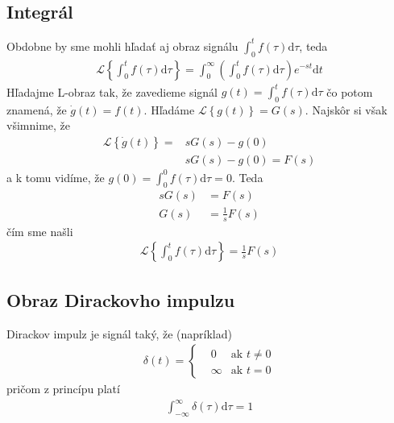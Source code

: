 \documentclass[a4paper, 10pt, ]{article}
\begin{document}
\subsection{Integrál}

Obdobne by sme mohli hľadať aj obraz signálu $\int_0^t f(\tau) \text{d}\tau$, teda
\begin{align}
    \mathcal L \left\{ \int_0^t f(\tau) \text{d}\tau \right\} = \int_0^\infty \left(\int_0^t f(\tau) \text{d}\tau \right) e^{-st}\text{d}t
\end{align}
Hľadajme L-obraz tak, že zavedieme signál $g(t) = \int_0^t f(\tau) \text{d}\tau$ čo potom znamená, že $\dot g(t) = f(t)$. Hľadáme $\mathcal L \left\{ g(t) \right\} = G(s)$. Najskôr si však všimnime, že
\begin{equation}
    \begin{aligned}
        \mathcal L \left\{ \dot g(t) \right\} =& s G(s) - g(0) \\
        & s G(s) - g(0) = F(s)
    \end{aligned}
\end{equation}
a k tomu vidíme, že $g(0) = \int_0^0 f(\tau) \text{d}\tau = 0$. Teda
\begin{subequations}
    \begin{align}
        sG(s) &= F(s) \\
        G(s) &= \frac{1}{s} F(s)
    \end{align}
\end{subequations}
čím sme našli
\begin{align}
    \mathcal L \left\{ \int_0^t f(\tau) \text{d}\tau \right\} = \frac{1}{s} F(s)
\end{align}






\subsection{Obraz Dirackovho impulzu}

Dirackov impulz je signál taký, že (napríklad)
\begin{align}
    \delta(t) =
    \left\{
        \begin{aligned}
            &0 & \text{ak $t \neq 0$} \\
            &\infty & \text{ak $t = 0$}
        \end{aligned}
    \right.
\end{align}
pričom z princípu platí
\begin{align}
    \int_{-\infty}^\infty \delta(\tau) \text{d}\tau = 1
\end{align}
\end{document}
